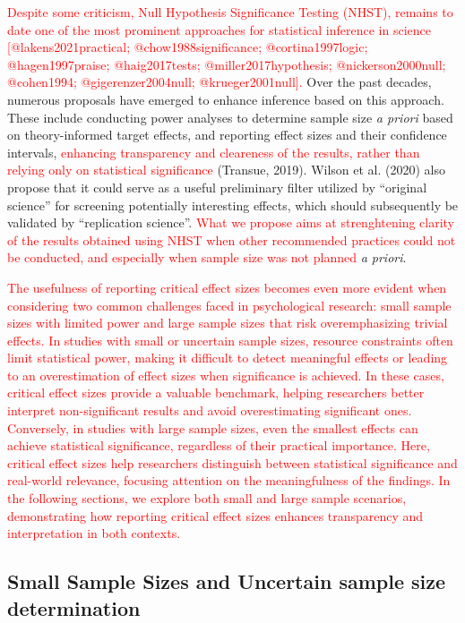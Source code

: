 \documentclass[
  man]{apa7}
\begin{document}
\textcolor{red}{Despite some criticism, Null Hypothesis Significance Testing (NHST), remains to date one of the most prominent approaches for statistical inference in science [@lakens2021practical; @chow1988significance; @cortina1997logic; @hagen1997praise; @haig2017tests; @miller2017hypothesis; @nickerson2000null; @cohen1994; @gigerenzer2004null; @krueger2001null].} Over the past decades, numerous proposals have emerged to enhance inference based on this approach. These include conducting power analyses to determine sample size \textit{a priori} based on theory-informed target effects, and reporting effect sizes and their confidence intervals, \textcolor{red}{enhancing transparency and cleareness of the results, rather than relying only on statistical significance} (Transue, 2019). Wilson et al. (2020) also propose that it could serve as a useful preliminary filter utilized by ``original science'' for screening potentially interesting effects, which should subsequently be validated by ``replication science''. \textcolor{red}{What we propose aims at strenghtening clarity of the results obtained using NHST when other recommended practices could not be conducted, and especially when sample size was not planned} \textit{a priori}.

\textcolor{red}{The usefulness of reporting critical effect sizes becomes even more evident when considering two common challenges faced in psychological research: small sample sizes with limited power and large sample sizes that risk overemphasizing trivial effects. In studies with small or uncertain sample sizes, resource constraints often limit statistical power, making it difficult to detect meaningful effects or leading to an overestimation of effect sizes when significance is achieved. In these cases, critical effect sizes provide a valuable benchmark, helping researchers better interpret non-significant results and avoid overestimating significant ones. Conversely, in studies with large sample sizes, even the smallest effects can achieve statistical significance, regardless of their practical importance. Here, critical effect sizes help researchers distinguish between statistical significance and real-world relevance, focusing attention on the meaningfulness of the findings. In the following sections, we explore both small and large sample scenarios, demonstrating how reporting critical effect sizes enhances transparency and interpretation in both contexts.}

\hypertarget{small-sample-sizes-and-uncertain-sample-size-determination}{%
\subsection{Small Sample Sizes and Uncertain sample size determination}\label{small-sample-sizes-and-uncertain-sample-size-determination}}
\end{document}
